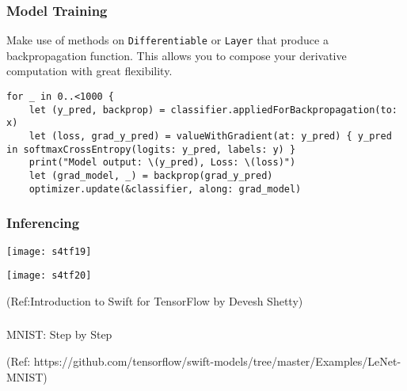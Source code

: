 \begin{frame}[fragile] \frametitle{Model Training}

Make use of methods on \lstinline|Differentiable| or \lstinline|Layer| that produce a backpropagation function. This allows you to compose your derivative computation with great flexibility.

\begin{lstlisting}[basicstyle=\scriptsize]
for _ in 0..<1000 {
    let (y_pred, backprop) = classifier.appliedForBackpropagation(to: x)
    let (loss, grad_y_pred) = valueWithGradient(at: y_pred) { y_pred in softmaxCrossEntropy(logits: y_pred, labels: y) }
    print("Model output: \(y_pred), Loss: \(loss)")
    let (grad_model, _) = backprop(grad_y_pred)
    optimizer.update(&classifier, along: grad_model)
\end{lstlisting}

\end{frame}

\begin{frame}[fragile] \frametitle{Inferencing}

\begin{center}
\texttt{[image: s4tf19]}

\texttt{[image: s4tf20]}

\end{center}


{\tiny (Ref:Introduction to Swift for TensorFlow by Devesh Shetty)}

\end{frame}

\begin{frame}[fragile]\frametitle{}
\begin{center}
{\Large MNIST: Step by Step}

{\tiny (Ref: https://github.com/tensorflow/swift-models/tree/master/Examples/LeNet-MNIST)}

\end{center}
\end{frame}

